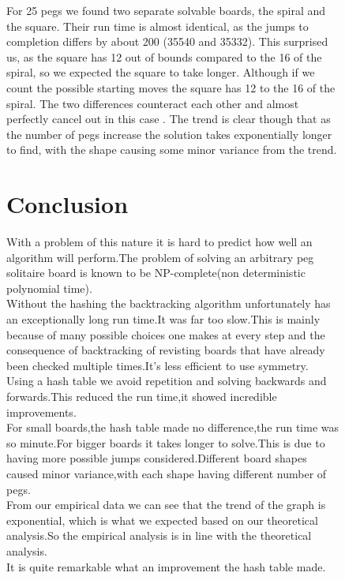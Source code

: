 \documentclass[11pt]{article}
\begin{document}
\newpage
\begin{figure}
For 25 pegs we found two separate solvable boards, the spiral and the square. Their run time is almost identical, as the jumps to completion differs by about 200 (35540 and 35332). This surprised us, as the square has 12 out of bounds compared to the 16 of the spiral, so we expected the square to take longer. Although if we count the possible starting moves the square has 12 to the 16 of the spiral. The two differences counteract each other and almost perfectly cancel out in this case
\newline.
\newline
The trend is clear though that as the number of pegs increase the solution takes exponentially longer to find, with the shape causing some minor variance from the trend.

\section{Conclusion}
With a problem of this nature it is hard to predict how well an algorithm will perform.The problem of solving an arbitrary peg solitaire board is known to be NP-complete(non deterministic polynomial time).\\

Without the hashing the backtracking algorithm unfortunately has an exceptionally long run time.It was far too slow.This is mainly because of many possible choices one makes at every step and the consequence of backtracking of revisting boards that have already been checked multiple times.It's less efficient to use symmetry.\\

Using a hash table we avoid repetition and solving backwards and forwards.This reduced the run time,it showed incredible improvements.\\

For small boards,the hash table made no difference,the run time was so minute.For bigger boards it takes longer to solve.This is due to having more possible jumps considered.Different board shapes caused minor variance,with each shape having different number of pegs.\\


From our empirical data we can see that the trend of the graph is exponential, which is what we expected based on our theoretical analysis.So the empirical analysis is in line with the theoretical analysis.\\
It is quite remarkable what an improvement the hash table made.

\end{figure}

\newpage
\begin{figure}



\end{figure}
\end{document}
